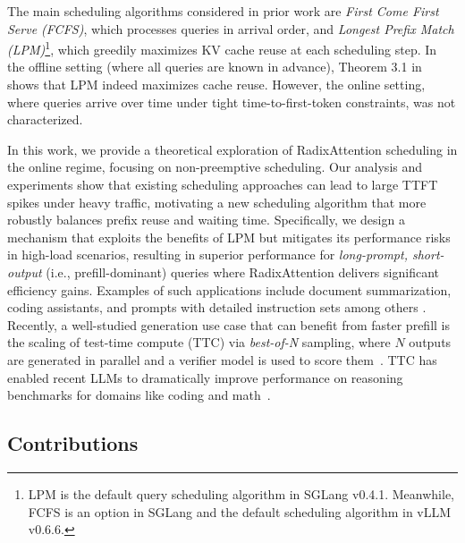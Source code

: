 The main scheduling algorithms considered in prior work are \emph{First Come First Serve (FCFS)}, which processes queries in arrival order, and \emph{Longest Prefix Match (LPM)}\footnote{LPM is the default query scheduling algorithm in SGLang v0.4.1. Meanwhile, FCFS is an option in SGLang and the default scheduling algorithm in vLLM v0.6.6.}, which greedily maximizes KV cache reuse at each scheduling step. In the offline setting (where all queries are known in advance), Theorem 3.1 in \cite{zheng2024sglang} shows that LPM indeed maximizes cache reuse. However, the online setting, where queries arrive over time under tight time-to-first-token constraints, was not characterized.


In this work, we provide a theoretical exploration of RadixAttention scheduling in the online regime, focusing on non-preemptive 
scheduling. Our analysis and experiments show that existing scheduling approaches can lead to large TTFT spikes under heavy traffic, motivating a new scheduling algorithm that more robustly balances prefix reuse and waiting time. Specifically, we design a mechanism that exploits the benefits of LPM but mitigates its performance risks in high-load scenarios, resulting in superior performance for \emph{long-prompt, short-output} (i.e., prefill-dominant) queries where RadixAttention delivers significant efficiency gains. Examples of such applications include document summarization, coding assistants, and prompts with detailed instruction sets among others \cite{anthropic_prompt_caching}. Recently, a well-studied generation use case that can benefit from faster prefill is the scaling of test-time compute (TTC) via \textit{best-of-N} sampling, where $N$ outputs are generated in parallel and a verifier model is used to score them~\cite{snell2024scaling, cobbe2021training}. TTC has enabled recent LLMs to dramatically improve performance on reasoning benchmarks for domains like coding and math~\cite{guo2025deepseek}.

\subsection{Contributions}

